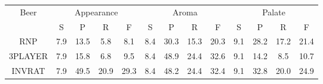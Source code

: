 \documentclass[letterpaper]{article} %
\begin{document}
\begin{table*}[!ht]
    \centering
\small
    \begin{tabular}{c|cccc|cccc|cccc}
\hline%
\multicolumn{1}{c|}{\multirow{2}{*}{Beer}} & \multicolumn{4}{c|}{Appearance}                               & \multicolumn{4}{c|}{Aroma}                                    & \multicolumn{4}{c}{Palate}                                   \\
\multicolumn{1}{c|}{}                      & S    & P             & R             & \multicolumn{1}{c|}{F} & S    & P             & R             & \multicolumn{1}{c|}{F} & S    & P             & R             & \multicolumn{1}{c}{F} \\ \hline
RNP                                        & 7.9  & 13.5          & 5.8           & 8.1                    & 8.4  & 30.3          & 15.3          & 20.3                   & 9.1  & 28.2          & 17.2          & 21.4                   \\
3PLAYER                                    & 7.9  & 15.8          & 6.8           & 9.5                    & 8.4  & 48.9          & 24.4          & 32.6                   & 9.1  & 14.2          & 8.5           & 10.7                   \\
INVRAT                                     & 7.9  & 49.5          & 20.9          & 29.3                   & 8.4  & 48.2          & 24.4          & 32.4                   & 9.1  & 32.8          & 20.0          & 24.9                   \\


\end{tabular}
\end{table*}
\end{document}

